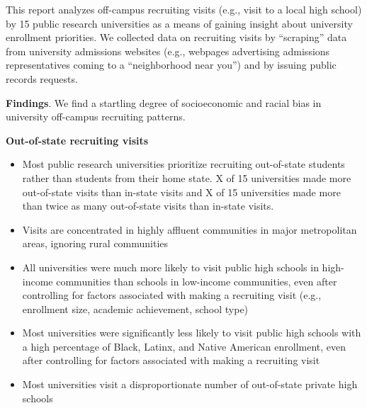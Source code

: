 \documentclass[twoside]{article}
\begin{document}

This report analyzes off-campus recruiting visits (e.g., visit to a local high school) by 15 public research universities as a means of gaining insight about university enrollment priorities. We collected data on recruiting visits by “scraping” data from university admissions websites (e.g., webpages advertising admissions representatives coming to a ``neighborhood near you'') and by issuing public records requests.

\textbf{Findings}. We find a startling degree of socioeconomic and racial bias in university off-campus recruiting patterns.

\textbf{Out-of-state recruiting visits}
\begin{itemize}
    \item Most public research universities prioritize recruiting out-of-state students rather than students from their home state.  X of 15 universities made more out-of-state visits than in-state visits and X of 15 universities made more than twice as many out-of-state visits than in-state visits.
    \item Visits are concentrated in highly affluent communities in major metropolitan areas, ignoring rural communities
    \item All universities were much more likely to visit public high schools in high-income communities than schools in low-income communities, even after controlling for factors associated with making a recruiting visit (e.g., enrollment size, academic achievement, school type)
    \item Most universities were significantly less likely to visit public high schools with a high percentage of Black, Latinx, and Native American enrollment, even after controlling for factors associated with making a recruiting visit
    \item Most universities visit a disproportionate number of out-of-state private high schools
\end{itemize}
\end{document}
